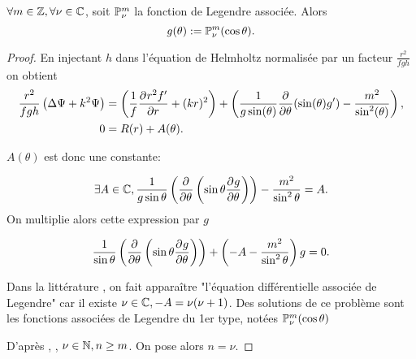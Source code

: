 \begin{prop}\(\forall m \in \ZZ, \forall \nu \in \CC\), soit \(\PP^m_\nu\) la fonction de Legendre associée. Alors
  \begin{equation}
    g(\theta) := \PP^m_\nu(\cos \theta).
  \end{equation}
\end{prop}
\begin{proof}

En injectant \(h\) dans l'équation de Helmholtz normalisée par un facteur \(\frac{r^2}{fgh}\) on obtient
\begin{align*}
     \frac{r^2}{fgh} \left(\Delta \Psi + k^2 \Psi\right) &=
     \left(\frac{1}{f}\ddr{r}{r^2f'} + (kr)^2\right) +
     \left(\frac{1}{g\sin(\theta)} \ddr{\theta}{}(\sin(\theta)g') -  \frac{m^2}{\sin^2(\theta)}\right),
     \\
 0 &= R(r) + A(\theta).
\end{align*}

\(A(\theta)\) est donc une constante:

\[
 \exists A \in \CC, \frac{1}{g\sin\theta}\left(\ddr{\theta}{}\left(\sin\theta\ddr{\theta}{g}\right)\right)  -\frac{m^2}{\sin^2\theta} = A.
\]
  On multiplie alors cette expression par \(g\)

  \begin{equation*}
    \label{eq:helm:legendre}\frac{1}{\sin\theta}\left(\ddr{\theta}{}\left(\sin\theta\ddr{\theta}{g}\right)\right) + \left(- A -\frac{m^2}{\sin^2\theta}\right)g = 0.
  \end{equation*}

Dans la littérature \cite{abramowitz_handbook_1964}, on fait apparaître "l'équation différentielle associée de Legendre" car il existe \(
\nu \in \CC,-A = \nu(\nu + 1)\). Des solutions de ce problème sont les fonctions associées de Legendre du 1er type, notées \(\PP^m_\nu(\cos \theta)\)

D'après \cite[p.~1264]{abramowitz_handbook_1964}, \cite[p.~84]{bohren_absorption_2004}, \(\nu \in \NN, n\ge m \). On pose alors \(n = \nu\).





\end{proof}
